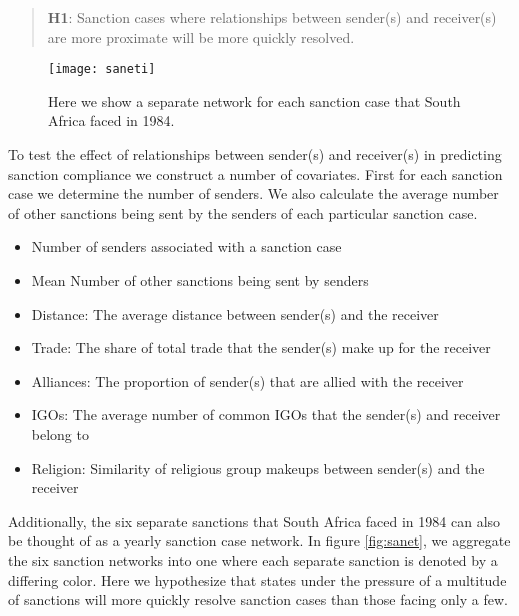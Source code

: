
\begin{quote}
	\textbf{H1}: Sanction cases where relationships between sender(s) and receiver(s) are more proximate will be more quickly resolved.
\end{quote}

\begin{figure}[ht]
	\centering
	\texttt{[image: saneti]}
	\caption{Here we show a separate network for each sanction case that South Africa faced in 1984.}
	\label{fig:saneti}
\end{figure}
\FloatBarrier

To test the effect of relationships between sender(s) and receiver(s) in predicting sanction compliance we construct a number of covariates. First for each sanction case we determine the number of senders. We also calculate the average number of other sanctions being sent by the senders of each particular sanction case.  

	\begin{itemize}
		\item Number of senders associated with a sanction case
		\item Mean Number of other sanctions being sent by senders
		\item Distance: The average distance between sender(s) and the receiver
		\item Trade: The share of total trade that the sender(s) make up for the receiver		
		\item Alliances: The proportion of sender(s) that are allied with the receiver
		\item IGOs: The average number of common IGOs that the sender(s) and receiver belong to
		\item Religion: Similarity of religious group makeups between sender(s) and the receiver
	\end{itemize}

Additionally, the six separate sanctions that South Africa faced in 1984 can also be thought of as a yearly sanction case network. In figure \ref{fig:sanet}, we aggregate the six sanction networks into one where each separate sanction is denoted by a differing color. Here we hypothesize that states under the pressure of a multitude of sanctions will more quickly resolve sanction cases than those facing only a few.

